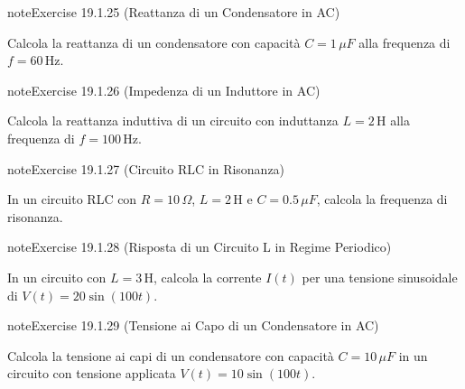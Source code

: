 \documentclass[letterpaper,10pt,italian]{jupyterBook}
\begin{document}
\begin{sphinxadmonition}{note}{Exercise 19.1.25 (Reattanza di un Condensatore in AC)}



\sphinxAtStartPar
Calcola la reattanza di un condensatore con capacità \(C = 1 \, \mu F\) alla frequenza di \(f = 60 \, \text{Hz}\).
\end{sphinxadmonition}
 \label{exercise:ch/electromagnetism/circuits-electric-problems-exercise-25}

\begin{sphinxadmonition}{note}{Exercise 19.1.26 (Impedenza di un Induttore in AC)}



\sphinxAtStartPar
Calcola la reattanza induttiva di un circuito con induttanza \(L = 2 \, \text{H}\) alla frequenza di \(f = 100 \, \text{Hz}\).
\end{sphinxadmonition}
 \label{exercise:ch/electromagnetism/circuits-electric-problems-exercise-26}

\begin{sphinxadmonition}{note}{Exercise 19.1.27 (Circuito RLC in Risonanza)}



\sphinxAtStartPar
In un circuito RLC con \(R = 10 \, \Omega\), \(L = 2 \, \text{H}\) e \(C = 0.5 \, \mu F\), calcola la frequenza di risonanza.
\end{sphinxadmonition}
 \label{exercise:ch/electromagnetism/circuits-electric-problems-exercise-27}

\begin{sphinxadmonition}{note}{Exercise 19.1.28 (Risposta di un Circuito L in Regime Periodico)}



\sphinxAtStartPar
In un circuito con \(L = 3 \, \text{H}\), calcola la corrente \(I(t)\) per una tensione sinusoidale di \(V(t) = 20 \sin(100 t)\).
\end{sphinxadmonition}
 \label{exercise:ch/electromagnetism/circuits-electric-problems-exercise-28}

\begin{sphinxadmonition}{note}{Exercise 19.1.29 (Tensione ai Capo di un Condensatore in AC)}



\sphinxAtStartPar
Calcola la tensione ai capi di un condensatore con capacità \(C = 10 \, \mu F\) in un circuito con tensione applicata \(V(t) = 10 \sin(100 t)\).
\end{sphinxadmonition}
 \label{exercise:ch/electromagnetism/circuits-electric-problems-exercise-29}
\end{document}
